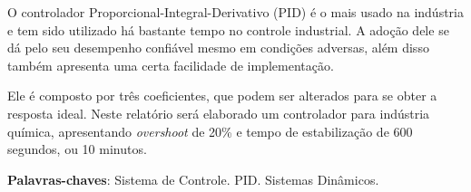 \documentclass[
	12pt,				%
	openany,			%
	oneside,			%
	a4paper,			%
	english,			%
	french,				%
	spanish,			%
	brazil,				%
	]{abntex2}
\begin{document}

\frenchspacing 


\imprimircapa

\imprimirfolhaderosto*


{
\ABNTEXchapterfont



\setlength{\absparsep}{18pt} %
\begin{resumo}
 O controlador Proporcional-Integral-Derivativo (PID) é o mais usado na indústria e tem sido utilizado há bastante tempo no controle industrial. A adoção dele se dá pelo seu desempenho confiável mesmo em condições adversas, além disso também apresenta uma certa facilidade de implementação. 
 
 Ele é composto por três coeficientes, que podem ser alterados para se obter a resposta ideal. Neste relatório será elaborado um controlador para indústria química, apresentando \textit{overshoot} de 20\% e tempo de estabilização de 600 segundos, ou 10 minutos.

 \noindent
 \textbf{Palavras-chaves}: Sistema de Controle. PID. Sistemas Dinâmicos.
\end{resumo}

\listoffigures*
\cleardoublepage

\listoftables*
\cleardoublepage



}
\end{document}
